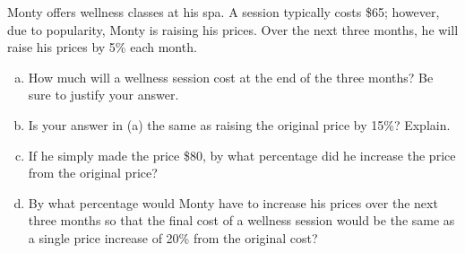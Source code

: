 \documentclass[11pt,letterpaper]{article}
\begin{document}
 Monty offers wellness classes at his spa. A session typically costs \$65; however, due to popularity, Monty is raising his prices. Over the next three months, he will raise his prices by 5\% each month. 
	\begin{enumerate}[(a)]
	\item How much will a wellness session cost at the end of the three months? Be sure to justify your answer. 
	\item Is your answer in (a) the same as raising the original price by 15\%? Explain. 
	\item If he simply made the price \$80, by what percentage did he increase the price from the original price?
	\item By what percentage would Monty have to increase his prices over the next three months so that the final cost of a wellness session would be the same as a single price increase of 20\% from the original cost?
	\end{enumerate}
\end{document}
